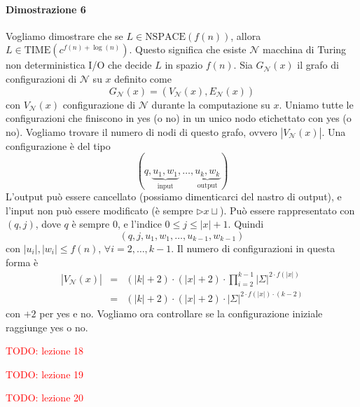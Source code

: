 \paragraph{Dimostrazione 6} Vogliamo dimostrare che se $L\in\text{NSPACE}(f(n))$, allora $L\in\text{TIME}(c^{f(n)+\log(n)})$. Questo significa che esiste $\mathcal{N}$ macchina di Turing non deterministica I/O che decide $L$ in spazio $f(n)$. Sia $G_\mathcal{N}(x)$ il grafo di configurazioni di $\mathcal{N}$ su $x$ definito come
$$
    G_\mathcal{N}(x) = (V_\mathcal{N}(x),E_\mathcal{N}(x))
$$
con $V_\mathcal{N}(x)$ configurazione di $\mathcal{N}$ durante la computazione su $x$. Uniamo tutte le configurazioni che finiscono in yes (o no) in un unico nodo etichettato con yes (o no). Vogliamo trovare il numero di nodi di questo grafo, ovvero $|V_\mathcal{N}(x)|$. Una configurazione è del tipo 
$$
    (q,\underbrace{u_1,w_1}_{\text{input}},\dots,\underbrace{u_k,w_k}_{\text{output}})
$$
L'output può essere cancellato (possiamo dimenticarci del nastro di output), e l'input non può essere modificato (è sempre $\rhd x\sqcup$). Può essere rappresentato con $(q,j)$, dove $q$ è sempre 0, e l'indice $0\leq j\leq|x|+1$. Quindi 
$$
    (q,j,u_1,w_1,\dots,u_{k-1},w_{k-1})
$$
con $|u_i|,|w_i|\leq f(n)$, $\forall i=2,\dots,k-1$. Il numero di configurazioni in questa forma è
\begin{eqnarray*}
    |V_\mathcal{N}(x)| &=& (|k|+2)\cdot(|x|+2)\cdot\prod_{i=2}^{k-1} |\Sigma|^{2\cdot f(|x|)}\\
    &=& (|k|+2)\cdot(|x|+2)\cdot|\Sigma|^{2\cdot f(|x|)\cdot(k-2)}
\end{eqnarray*}
con $+2$ per yes e no. Vogliamo ora controllare se la configurazione iniziale raggiunge yes o no.


\textcolor{Red}{TODO: lezione 18}

\textcolor{Red}{TODO: lezione 19}

\textcolor{Red}{TODO: lezione 20}
